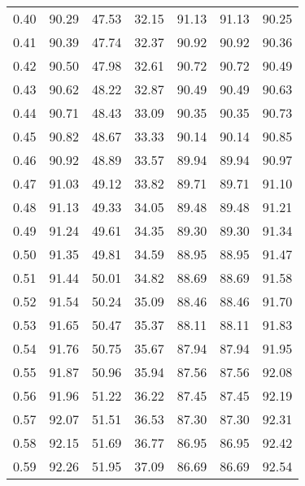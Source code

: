 \begin{tabular}{|c|c|c|c|c|c|c|}
      0.40 &     90.29 &     47.53 &      32.15 &   91.13 &      91.13 &         90.25 \\
      0.41 &     90.39 &     47.74 &      32.37 &   90.92 &      90.92 &         90.36 \\
      0.42 &     90.50 &     47.98 &      32.61 &   90.72 &      90.72 &         90.49 \\
      0.43 &     90.62 &     48.22 &      32.87 &   90.49 &      90.49 &         90.63 \\
      0.44 &     90.71 &     48.43 &      33.09 &   90.35 &      90.35 &         90.73 \\
      0.45 &     90.82 &     48.67 &      33.33 &   90.14 &      90.14 &         90.85 \\
      0.46 &     90.92 &     48.89 &      33.57 &   89.94 &      89.94 &         90.97 \\
      0.47 &     91.03 &     49.12 &      33.82 &   89.71 &      89.71 &         91.10 \\
      0.48 &     91.13 &     49.33 &      34.05 &   89.48 &      89.48 &         91.21 \\
      0.49 &     91.24 &     49.61 &      34.35 &   89.30 &      89.30 &         91.34 \\
      0.50 &     91.35 &     49.81 &      34.59 &   88.95 &      88.95 &         91.47 \\
      0.51 &     91.44 &     50.01 &      34.82 &   88.69 &      88.69 &         91.58 \\
      0.52 &     91.54 &     50.24 &      35.09 &   88.46 &      88.46 &         91.70 \\
      0.53 &     91.65 &     50.47 &      35.37 &   88.11 &      88.11 &         91.83 \\
      0.54 &     91.76 &     50.75 &      35.67 &   87.94 &      87.94 &         91.95 \\
      0.55 &     91.87 &     50.96 &      35.94 &   87.56 &      87.56 &         92.08 \\
      0.56 &     91.96 &     51.22 &      36.22 &   87.45 &      87.45 &         92.19 \\
      0.57 &     92.07 &     51.51 &      36.53 &   87.30 &      87.30 &         92.31 \\
      0.58 &     92.15 &     51.69 &      36.77 &   86.95 &      86.95 &         92.42 \\
      0.59 &     92.26 &     51.95 &      37.09 &   86.69 &      86.69 &         92.54 \\

\end{tabular}
